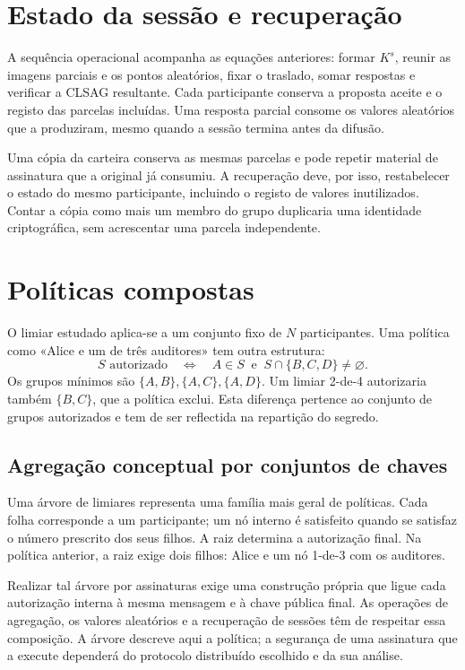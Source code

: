 \section{Estado da sessão e recuperação}
\label{sec:multisig-cli}

A sequência operacional acompanha as equações anteriores: formar
\(K^s\), reunir as imagens parciais e os pontos aleatórios, fixar o
traslado, somar respostas e verificar a CLSAG resultante. Cada participante
conserva a proposta aceite e o registo das parcelas incluídas. Uma resposta
parcial consome os valores aleatórios que a produziram, mesmo quando a sessão
termina antes da difusão.

Uma cópia da carteira conserva as mesmas parcelas e pode repetir material de
assinatura que a original já consumiu. A recuperação deve, por isso,
restabelecer o estado do mesmo participante, incluindo o registo de valores
inutilizados. Contar a cópia como mais um membro do grupo duplicaria uma
identidade criptográfica, sem acrescentar uma parcela independente.

\section{Políticas compostas}
\label{sec:general-key-families}

O limiar estudado aplica-se a um conjunto fixo de \(N\) participantes. Uma
política como «Alice e um de três auditores» tem outra estrutura:
\[
 S\text{ autorizado}\quad\Longleftrightarrow\quad
 A\in S\ \text{ e }\ S\cap\{B,C,D\}\ne\varnothing.
\]
Os grupos mínimos são \(\{A,B\},\{A,C\},\{A,D\}\). Um limiar
2-de-4 autorizaria também \(\{B,C\}\), que a política exclui. Esta diferença
pertence ao conjunto de grupos autorizados e tem de ser reflectida na
repartição do segredo.

\subsection{Agregação conceptual por conjuntos de chaves}
\label{subsec:nesting-multisig-keys}

Uma árvore de limiares representa uma família mais geral de políticas. Cada
folha corresponde a um participante; um nó interno é satisfeito quando se
satisfaz o número prescrito dos seus filhos. A raiz determina a autorização
final. Na política anterior, a raiz exige dois filhos: Alice e um nó 1-de-3
com os auditores.

Realizar tal árvore por assinaturas exige uma construção própria que ligue
cada autorização interna à mesma mensagem e à chave pública final. As
operações de agregação, os valores aleatórios e a recuperação de sessões têm
de respeitar essa composição. A árvore descreve aqui a política; a
segurança de uma assinatura que a execute dependerá do protocolo distribuído
escolhido e da sua análise.

